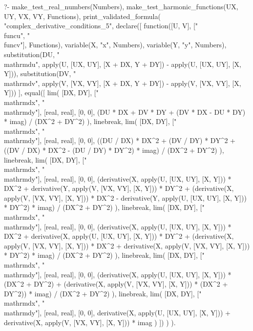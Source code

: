 \begin{prolog}
?-	make_test_real_numbers(Numbers),
	make_test_harmonic_functions(UX, UY, VX, VY, Functions),
	print_validated_formula(
		"complex_derivative_conditions_5",
		declare([
			function([U, V], ["\\func{u}", "\\func{v}"], Functions), 
			variable(X, "x", Numbers),
			variable(Y, "y", Numbers),
			substitution(DU, "\\mathrm{d}u", apply(U, [UX, UY], [X + DX, Y + DY]) - apply(U, [UX, UY], [X, Y])),
			substitution(DV, "\\mathrm{d}v", apply(V, [VX, VY], [X + DX, Y + DY]) - apply(V, [VX, VY], [X, Y]))
		],
			equal([
				lim(
					[DX, DY], ["\\mathrm{d}x", "\\mathrm{d}y"], [real, real], [0, 0],
					(DU * DX + DV * DY + (DV * DX - DU * DY) * imag) / (DX^2 + DY^2)
				),
				linebreak,
				lim(
					[DX, DY], ["\\mathrm{d}x", "\\mathrm{d}y"], [real, real], [0, 0],
					((DU / DX) * DX^2 + (DV / DY) * DY^2 + ((DV / DX) * DX^2 - (DU / DY) * DY^2) * imag) / (DX^2 + DY^2)
				),
				linebreak,
				lim(
					[DX, DY], ["\\mathrm{d}x", "\\mathrm{d}y"], [real, real], [0, 0],
					(derivative(X, apply(U, [UX, UY], [X, Y])) * DX^2 + derivative(Y, apply(V, [VX, VY], [X, Y])) * DY^2 + (derivative(X, apply(V, [VX, VY], [X, Y])) * DX^2 - derivative(Y, apply(U, [UX, UY], [X, Y])) * DY^2) * imag) / (DX^2 + DY^2)
				),
				linebreak,
				lim(
					[DX, DY], ["\\mathrm{d}x", "\\mathrm{d}y"], [real, real], [0, 0],
					(derivative(X, apply(U, [UX, UY], [X, Y])) * DX^2 + derivative(X, apply(U, [UX, UY], [X, Y])) * DY^2 + (derivative(X, apply(V, [VX, VY], [X, Y])) * DX^2 + derivative(X, apply(V, [VX, VY], [X, Y])) * DY^2) * imag) / (DX^2 + DY^2)
				),
				linebreak,
				lim(
					[DX, DY], ["\\mathrm{d}x", "\\mathrm{d}y"], [real, real], [0, 0],
					(derivative(X, apply(U, [UX, UY], [X, Y])) * (DX^2 + DY^2) + (derivative(X, apply(V, [VX, VY], [X, Y])) * (DX^2 + DY^2)) * imag) / (DX^2 + DY^2)
				),
				linebreak,
				lim(
					[DX, DY], ["\\mathrm{d}x", "\\mathrm{d}y"], [real, real], [0, 0],
					derivative(X, apply(U, [UX, UY], [X, Y])) + derivative(X, apply(V, [VX, VY], [X, Y])) * imag
				)
			])
		)
	).
\end{prolog}

